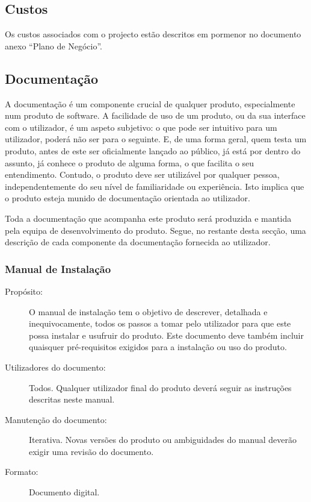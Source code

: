 \documentclass{article}
\begin{document}
 \subsection{Custos}
    Os custos associados com o projecto estão descritos em pormenor no documento anexo ``Plano de Negócio''.

  \subsection{Documentação}
    A documentação é um componente crucial de qualquer produto, especialmente num produto de software. A facilidade de uso de um produto, ou da sua interface com o utilizador, é um aspeto subjetivo: o que pode ser intuitivo para um utilizador, poderá não ser para o seguinte. E, de uma forma geral, quem testa um produto, antes de este ser oficialmente lançado ao público, já está por dentro do assunto, já conhece o produto de alguma forma, o que facilita o seu entendimento. Contudo, o produto deve ser utilizável por qualquer pessoa, independentemente do seu nível de familiaridade ou experiência. Isto implica que o produto esteja munido de documentação orientada ao utilizador.

    Toda a documentação que acompanha este produto será produzida e mantida pela equipa de desenvolvimento do produto. Segue, no restante desta secção, uma descrição de cada componente da documentação fornecida ao utilizador.

    \subsubsection{Manual de Instalação}
      \begin{description}
        \item[Propósito:]O manual de instalação tem o objetivo de descrever, detalhada e inequivocamente, todos os passos a tomar pelo utilizador para que este possa instalar e usufruir do produto. Este documento deve também incluir quaisquer pré-requisitos exigidos para a instalação ou uso do produto.
        \item[Utilizadores do documento:]Todos. Qualquer utilizador final do produto deverá seguir as instruções descritas neste manual.

        \item[Manutenção do documento:]Iterativa. Novas versões do produto ou ambiguidades do manual deverão exigir uma revisão do documento.
        \item[Formato:]Documento digital.
      \end{description}
\end{document}
